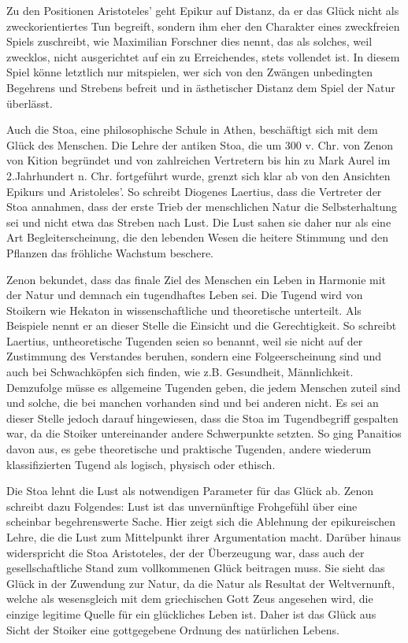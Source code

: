 Zu den Positionen Aristoteles' geht Epikur auf Distanz, da er das Glück nicht als zweckorientiertes Tun begreift, sondern ihm eher den Charakter eines \glqq zweckfreien Spiels\grqq{} zuschreibt, wie Maximilian Forschner dies nennt, \glqq das als solches, weil zwecklos, nicht ausgerichtet auf ein zu Erreichendes, stets vollendet ist.\grqq{}\cite[S.\,44]{MF93}
In diesem \glqq Spiel\grqq{} könne letztlich nur mitspielen, wer sich von den \glqq Zwängen unbedingten Begehrens und Strebens befreit und in ästhetischer Distanz dem Spiel der Natur überlässt.\grqq{}\cite[S.\,44]{MF93}
 
Auch die Stoa, eine philosophische Schule in Athen, beschäftigt sich mit dem Glück des Menschen. 
Die Lehre der antiken Stoa, die um 300 v. Chr. von Zenon von Kition begründet und von zahlreichen Vertretern bis hin zu Mark Aurel im 2.Jahrhundert n. Chr. fortgeführt wurde, grenzt sich klar ab von den Ansichten Epikurs und Aristoleles'. 
So schreibt Diogenes Laertius, dass die Vertreter der Stoa annahmen, dass der erste Trieb der menschlichen Natur die Selbsterhaltung sei und nicht etwa das Streben nach Lust\cite[S.\,48]{ZD67}.
Die Lust sahen sie daher nur als eine Art Begleiterscheinung, die \glqq den lebenden Wesen die heitere Stimmung und den Pflanzen das fröhliche Wachstum\grqq{} beschere. 

Zenon bekundet, dass das finale Ziel des Menschen ein Leben in Harmonie mit der Natur und demnach ein tugendhaftes Leben sei. 
Die Tugend wird von Stoikern wie Hekaton in wissenschaftliche und theoretische unterteilt. 
Als Beispiele nennt er an dieser Stelle die Einsicht und die Gerechtigkeit. 
So schreibt Laertius, untheoretische Tugenden seien so benannt, \glqq weil sie  nicht auf der Zustimmung des Verstandes beruhen, sondern eine Folgeerscheinung sind und auch bei Schwachköpfen sich finden, wie z.B. Gesundheit, Männlichkeit.\grqq{}\cite[S.\,50]{ZD67}
Demzufolge müsse es allgemeine Tugenden geben, die jedem Menschen zuteil sind und solche, die bei manchen vorhanden sind und bei anderen nicht. 
Es sei an dieser Stelle jedoch darauf hingewiesen, dass die Stoa im Tugendbegriff gespalten war, da die Stoiker untereinander andere Schwerpunkte setzten. 
So ging Panaitios davon aus, es gebe theoretische und praktische Tugenden, andere wiederum klassifizierten Tugend als logisch, physisch oder ethisch.

Die Stoa lehnt die Lust als notwendigen Parameter für das Glück ab. 
Zenon schreibt dazu Folgendes: \glqq Lust ist das unvernünftige Frohgefühl über eine scheinbar begehrenswerte Sache.\grqq{}\cite[S.\,60]{ZD67}
Hier zeigt sich die Ablehnung der epikureischen Lehre, die die Lust zum Mittelpunkt ihrer Argumentation macht. 
Darüber hinaus widerspricht die Stoa Aristoteles, der der Überzeugung war, dass auch der gesellschaftliche Stand zum vollkommenen Glück beitragen muss. 
Sie sieht das Glück in der Zuwendung zur Natur, da die Natur als Resultat der Weltvernunft, welche als wesensgleich mit dem griechischen Gott Zeus angesehen wird, die einzige legitime Quelle für ein glückliches Leben ist\cite[S.\,49]{ZD67}.
Daher ist das Glück aus Sicht der Stoiker eine gottgegebene Ordnung des natürlichen Lebens. 


